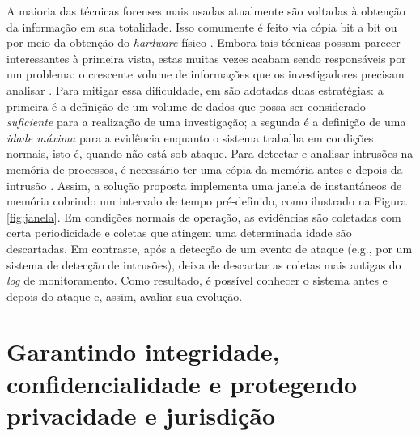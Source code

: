 A maioria das técnicas forenses mais usadas atualmente são voltadas à obtenção da informação em sua totalidade.
%
Isso comumente é feito via cópia bit a bit ou por meio da obtenção do \textit{hardware} físico \cite{SimouCloudChlng:2014} \cite{BemPastPresentFuture:2008}. 
%
Embora tais técnicas possam parecer interessantes à primeira vista, estas muitas vezes acabam sendo responsáveis por um problema: o crescente volume de informações que os investigadores precisam analisar \cite{QuickIncreaseVolumeImpact:2014}.
%
Para mitigar essa dificuldade, em \fancyname são adotadas duas estratégias: a primeira é a definição de um volume de dados que possa ser considerado \textit{suficiente} para a realização de uma investigação; a segunda é a definição de uma \textit{idade máxima} para a evidência enquanto o sistema trabalha em condições normais, isto é, quando não está sob ataque.
%
Para detectar e analisar intrusões na memória de processos, é necessário ter uma cópia da memória antes e depois da intrusão \cite{CaseMemoryForensics:2014}. 
%
Assim, a solução proposta implementa uma janela de instantâneos de memória cobrindo um intervalo de tempo pré-definido, como ilustrado na Figura \ref{fig:janela}. 
%
Em condições normais de operação, as evidências são coletadas com certa periodicidade e coletas que atingem uma determinada idade são descartadas.
%
Em contraste, após a detecção de um evento de ataque (e.g., por um sistema de detecção de intrusões), \fancyname deixa de descartar as coletas mais antigas do \textit{log} de monitoramento.
%
Como resultado, é possível conhecer o sistema antes e depois do ataque e, assim, avaliar sua evolução.
%
%

\section{Garantindo integridade, confidencialidade e protegendo privacidade e jurisdição}
\label{sec:proposal-desc-chain-of-custody}

